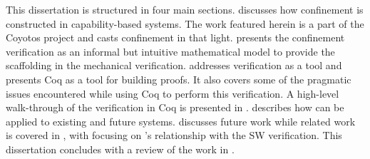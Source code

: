 This dissertation is structured in four main sections.
 discusses how confinement is constructed in capability-based systems.
The work featured herein is a part of the Coyotos project and  casts confinement in that light.
 presents the confinement verification as an informal but intuitive mathematical model to provide the scaffolding in the mechanical verification.
 addresses verification as a tool and presents Coq \cite{bertot-casteran-04} as a tool for building proofs.
It also covers some of the pragmatic issues encountered while using Coq to perform this verification.
A high-level walk-through of the verification in Coq is presented in .
 describes how \TMmodelName{} can be applied to existing and future systems.
 discusses future work while related work is covered in , with  focusing on \TMmodelName{}'s relationship with the SW verification.
This dissertation concludes with a review of the work in .

